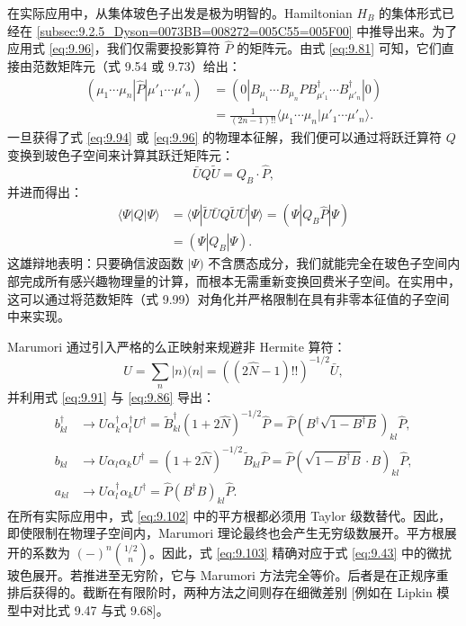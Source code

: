 在实际应用中，从集体玻色子出发是极为明智的。Hamiltonian $H_{B}$ 的集体形式已经在 \ref{subsec:9.2.5_Dyson=0073BB=008272=005C55=005F00}
中推导出来。为了应用式 \ref{eq:9.96}，我们仅需要投影算符 $\hat{P}$ 的矩阵元。由式 \ref{eq:9.81}
可知，它们直接由范数矩阵元（式 9.54 或 9.73）给出：
\begin{align}
(\mu_{1}\cdots\mu_{n}|\hat{P}|\mu'_{1}\cdots\mu'_{n}) & =(0|B_{\mu_{1}}\cdots B_{\mu_{n}}\hat{P}B^{\dagger}_{\mu'_{1}}\cdots B^{\dagger}_{\mu'_{n}}|0)\nonumber \\
 & =\frac{1}{(2n-1)!!}\langle\mu_{1}\cdots\mu_{n}|\mu'_{1}\cdots\mu'_{n}\rangle.\label{eq:9.99}
\end{align}
一旦获得了式 \ref{eq:9.94} 或 \ref{eq:9.96} 的物理本征解，我们便可以通过将跃迁算符 $Q$ 变换到玻色子空间来计算其跃迁矩阵元：
\begin{equation}
\bar{U}Q\tilde{U}=Q_{B}\cdot\hat{P},\label{eq:9.100}
\end{equation}
并进而得出：
\begin{align}
\langle\Psi|Q|\Psi\rangle & =\langle\Psi|\tilde{U}\bar{U}Q\tilde{U}\bar{U}|\Psi\rangle=(\Psi|Q_{B}\hat{P}|\Psi)\nonumber \\
 & =(\Psi|Q_{B}|\Psi).\label{eq:9.101}
\end{align}
这雄辩地表明：只要确信波函数 $|\Psi)$ 不含赝态成分，我们就能完全在玻色子空间内部完成所有感兴趣物理量的计算，而根本无需重新变换回费米子空间。在实用中，这可以通过将范数矩阵（式
9.99）对角化并严格限制在具有非零本征值的子空间中来实现。

Marumori 通过引入严格的么正映射来规避非 Hermite 算符：
\begin{equation}
U=\sum_{n}|n)(n|=\left((2\hat{N}-1)!!\right)^{-1/2}\bar{U},\label{eq:9.102}
\end{equation}
并利用式 \ref{eq:9.91} 与 \ref{eq:9.86} 导出：
\begin{align}
b^{\dagger}_{kl} & \to U\alpha^{\dagger}_{k}\alpha^{\dagger}_{l}U^{\dagger}=\tilde{B}^{\dagger}_{kl}(1+2\hat{N})^{-1/2}\hat{P}=\hat{P}\left(B^{\dagger}\sqrt{1-B^{\dagger}B}\right)_{kl}\hat{P},\nonumber \\
b_{kl} & \to U\alpha_{l}\alpha_{k}U^{\dagger}=(1+2\hat{N})^{-1/2}\tilde{B}_{kl}\hat{P}=\hat{P}\left(\sqrt{1-B^{\dagger}B}\cdot B\right)_{kl}\hat{P},\label{eq:9.103}\\
a_{kl} & \to U\alpha^{\dagger}_{l}\alpha_{k}U^{\dagger}=\hat{P}(B^{\dagger}B)_{kl}\hat{P}.\nonumber 
\end{align}
在所有实际应用中，式 \ref{eq:9.102} 中的平方根都必须用 Taylor 级数替代。因此，即使限制在物理子空间内，Marumori
理论最终也会产生无穷级数展开。平方根展开的系数为 $(-)^{n}\binom{1/2}{n}$。因此，式 \ref{eq:9.103}
精确对应于式 \ref{eq:9.43} 中的微扰玻色展开。若推进至无穷阶，它与 Marumori 方法完全等价。后者是在正规序重排后获得的。截断在有限阶时，两种方法之间则存在细微差别
{[}例如在 Lipkin 模型中对比式 9.47 与式 9.68{]}。

